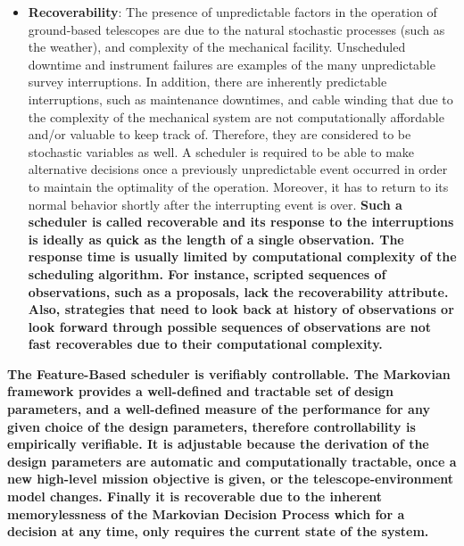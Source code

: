 \documentclass[12pt]{aastex62}
\theoremstyle{definition}
\begin{document}
\begin{itemize}
\item \textbf{Recoverability}: The presence of unpredictable factors in the operation of ground-based telescopes are due to the natural stochastic processes (such as the weather), and complexity of the mechanical facility. Unscheduled downtime and instrument failures are examples of the many unpredictable survey interruptions. In addition, there are inherently predictable interruptions, such as maintenance downtimes, and cable winding that due to the complexity of the mechanical system are not computationally affordable and/or valuable to keep track of. Therefore, they are considered to be stochastic variables as well. A scheduler is required to be able to make alternative decisions once a previously unpredictable event occurred in order to maintain the optimality of the operation. Moreover, it has to return to its normal behavior shortly after the interrupting event is over. {\bf Such a scheduler is called recoverable and its response to the interruptions is ideally as quick as the length of a single observation. The response time is usually limited by computational complexity of the scheduling algorithm. For instance, scripted sequences of observations, such as a proposals, lack the recoverability attribute. Also, strategies that need to look back at history of observations or look forward through possible sequences of observations are not fast recoverables due to their computational complexity.\bf}
\end{itemize}

{\bf The Feature-Based scheduler is verifiably controllable. The Markovian framework provides a well-defined and tractable set of design parameters, and a well-defined measure of the performance for any given choice of the design parameters, therefore controllability is empirically verifiable. It is adjustable because the derivation of the design parameters are automatic and computationally tractable, once a new high-level mission objective is given, or the telescope-environment model changes. Finally it is recoverable due to the inherent memorylessness of the Markovian Decision Process which for a decision at any time, only requires the current state of the system.\bf}
\end{document}
